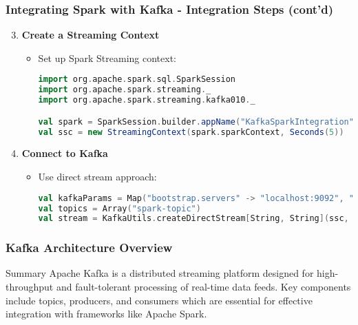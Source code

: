 \documentclass[aspectratio=169]{beamer}
\begin{document}
\begin{frame}[fragile]
    \frametitle{Integrating Spark with Kafka - Integration Steps (cont'd)}
    \begin{enumerate}
        \setcounter{enumi}{2}
        \item \textbf{Create a Streaming Context}
        \begin{itemize}
            \item Set up Spark Streaming context:
            \begin{lstlisting}[language=scala]
import org.apache.spark.sql.SparkSession
import org.apache.spark.streaming._
import org.apache.spark.streaming.kafka010._

val spark = SparkSession.builder.appName("KafkaSparkIntegration").getOrCreate()
val ssc = new StreamingContext(spark.sparkContext, Seconds(5))
            \end{lstlisting}
        \end{itemize}

        \item \textbf{Connect to Kafka}
        \begin{itemize}
            \item Use direct stream approach:
            \begin{lstlisting}[language=scala]
val kafkaParams = Map("bootstrap.servers" -> "localhost:9092", "key.deserializer" -> "org.apache.kafka.common.serialization.StringDeserializer", "value.deserializer" -> "org.apache.kafka.common.serialization.StringDeserializer", "group.id" -> "use_a_separate_group_id", "auto.offset.reset" -> "latest", "enable.auto.commit" -> (false: java.lang.Boolean))
val topics = Array("spark-topic")
val stream = KafkaUtils.createDirectStream[String, String](ssc, LocationStrategies.PreferConsistent, ConsumerStrategies.Subscribe[String, String](topics, kafkaParams))
            \end{lstlisting}
        \end{itemize}
    \end{enumerate}
\end{frame}

\begin{frame}
    \frametitle{Kafka Architecture Overview}
    \begin{block}{Summary}
        Apache Kafka is a distributed streaming platform designed for high-throughput and fault-tolerant processing of real-time data feeds.
        Key components include topics, producers, and consumers which are essential for effective integration with frameworks like Apache Spark.
    \end{block}
\end{frame}
\end{document}
